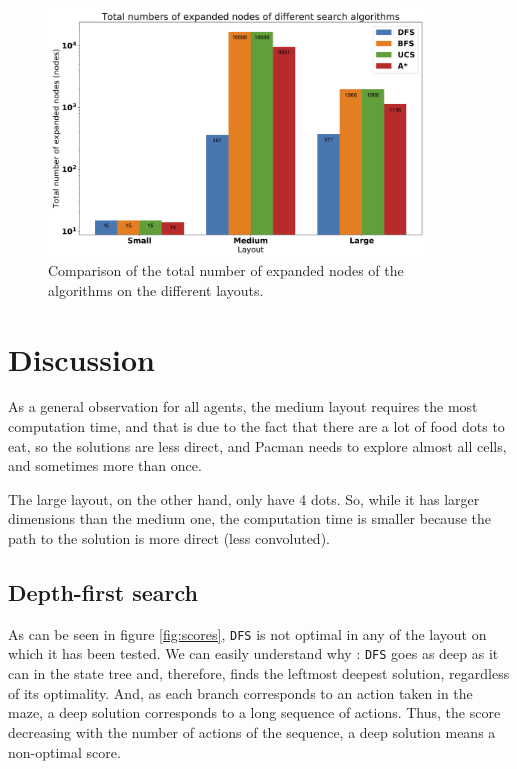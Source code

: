 \documentclass[a4paper, 12pt]{article}
\begin{document}
	\begin{figure}[!ht]
    	\centering
        \includegraphics[width=0.9\textwidth]{resources/png/nodes.png}
        \caption{Comparison of the total number of expanded nodes of the algorithms on the different layouts.}
        \label{fig:nodes}
    \end{figure}
	
	
	\section{Discussion}
	As a general observation for all agents, the medium layout requires the most computation time, and that is due to the fact that there are a lot of food dots to eat, so the solutions are less direct, and Pacman needs to explore almost all cells, and sometimes more than once.\par
	
	The large layout, on the other hand, only have 4 dots. So, while it has larger dimensions than the medium one, the computation time is smaller because the path to the solution is more direct (less convoluted).
	
	\subsection{Depth-first search}
	As can be seen in figure \ref{fig:scores}, \texttt{DFS} is not optimal in any of the layout on which it has been tested. We can easily understand why : \texttt{DFS} goes as deep as it can in the state tree and, therefore, finds the leftmost deepest solution, regardless of its optimality. And, as each branch corresponds to an action taken in the maze, a deep solution corresponds to a long sequence of actions. Thus, the score decreasing with the number of actions of the sequence, a deep solution means a non-optimal score.\par
	
\end{document}
